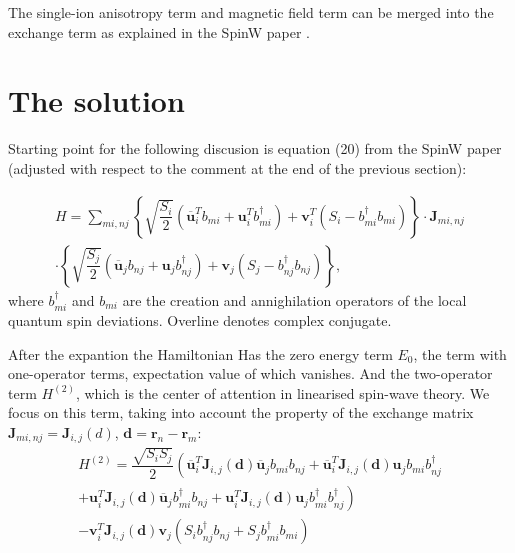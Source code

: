 \documentclass[a4paper,12pt]{article}
\begin{document}
        The single-ion anisotropy term and magnetic field term can be merged into the exchange term as explained in the SpinW paper \cite{toth2015linear}.

    \section{The solution}

    Starting point for the following discusion is equation (20) from the SpinW paper \cite{toth2015linear} 
    (adjusted with respect to the comment at the end of the previous section):

    \begin{multline}
        H = \sum_{mi, nj}\left\{\sqrt{\dfrac{S_{i}}{2}}\left(\overline{\boldsymbol{u}}^T_i b_{mi} + \boldsymbol{u}^T_i b^{\dag}_{mi} \right) + 
        \boldsymbol{v}^T_i(S_i - b^{\dag}_{mi}b_{mi})\right\}  \cdot
        \boldsymbol{J}_{mi, nj}\\
        \cdot\left\{\sqrt{\dfrac{S_{j}}{2}}\left(\overline{\boldsymbol{u}}_j b_{nj} + \boldsymbol{u}_j b^{\dag}_{nj} \right) + 
        \boldsymbol{v}_j(S_j - b^{\dag}_{nj}b_{nj})\right\},
    \end{multline}
    where $b^{\dag}_{mi}$ and $b_{mi}$ are the creation and annighilation operators of the local quantum spin deviations. Overline denotes complex conjugate.

    After the expantion the Hamiltonian Has the zero energy term $E_0$, the term with one-operator terms, expectation value of which vanishes. 
    And the two-operator term $H^{(2)}$, which is the center of attention in linearised spin-wave theory. 
    We focus on this term, taking into account the property of the exchange matrix $\boldsymbol{J}_{mi, nj} = \boldsymbol{J}_{i,j}(d)$, $\boldsymbol{d} = \boldsymbol{r}_n - \boldsymbol{r}_m$:
    \begin{multline}
        H^{(2)} = \dfrac{\sqrt{S_i S_j}}{2}\left(\overline{\boldsymbol{u}}^T_i\boldsymbol{J}_{i,j}(\boldsymbol{d})\overline{\boldsymbol{u}}_jb_{mi}b_{nj} +
        \overline{\boldsymbol{u}}^T_i\boldsymbol{J}_{i,j}(\boldsymbol{d})\boldsymbol{u}_j b_{mi}b^{\dag}_{nj}\right. \\+ 
        \left.\boldsymbol{u}^T_i\boldsymbol{J}_{i,j}(\boldsymbol{d})\overline{\boldsymbol{u}}_jb^{\dag}_{mi}b_{nj} +
        \boldsymbol{u}^T_i\boldsymbol{J}_{i,j}(\boldsymbol{d})\boldsymbol{u}_jb^{\dag}_{mi}b^{\dag}_{nj}\right) \\-
        \boldsymbol{v}^T_i\boldsymbol{J}_{i,j}(\boldsymbol{d})\boldsymbol{v}_j\left(S_ib^{\dag}_{nj}b_{nj} + S_jb^{\dag}_{mi}b_{mi}\right)
    \end{multline}
\end{document}
